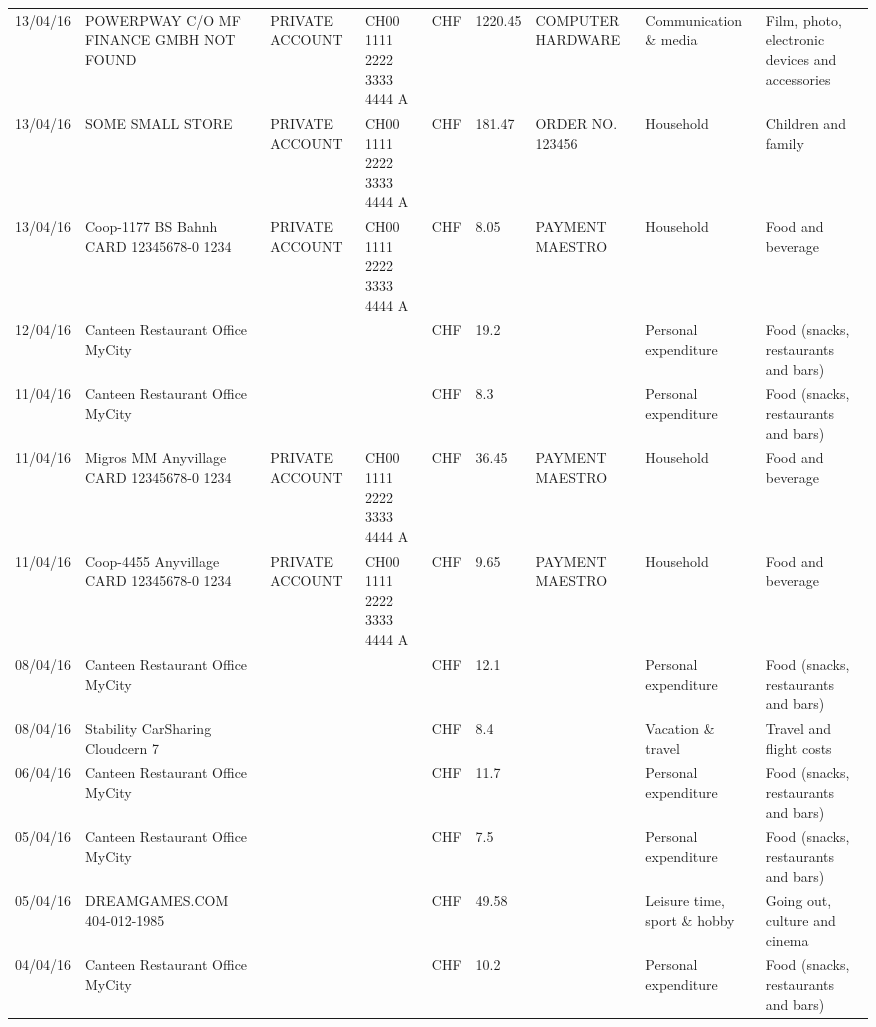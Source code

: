 \begin{landscape}
\begin{center}
\begin{longtable}{lllllllll}
		13/04/16 & POWERPWAY C/O MF FINANCE GMBH NOT FOUND & PRIVATE ACCOUNT & CH00 1111 2222 3333 4444 A & CHF   & 1220.45 & COMPUTER HARDWARE & Communication \& media & Film, photo, electronic devices and accessories \\
		13/04/16 & SOME SMALL STORE & PRIVATE ACCOUNT & CH00 1111 2222 3333 4444 A & CHF   & 181.47 & ORDER NO. 123456 & Household & Children and family \\
		13/04/16 & Coop-1177 BS Bahnh CARD 12345678-0 1234 & PRIVATE ACCOUNT & CH00 1111 2222 3333 4444 A & CHF   & 8.05  & PAYMENT MAESTRO & Household & Food and beverage \\
		12/04/16 & Canteen Restaurant Office      MyCity &       &       & CHF   & 19.2  &       & Personal expenditure & Food (snacks, restaurants and bars) \\
		11/04/16 & Canteen Restaurant Office      MyCity &       &       & CHF   & 8.3   &       & Personal expenditure & Food (snacks, restaurants and bars) \\
		11/04/16 & Migros MM Anyvillage CARD 12345678-0 1234 & PRIVATE ACCOUNT & CH00 1111 2222 3333 4444 A & CHF   & 36.45 & PAYMENT MAESTRO & Household & Food and beverage \\
		11/04/16 & Coop-4455 Anyvillage CARD 12345678-0 1234 & PRIVATE ACCOUNT & CH00 1111 2222 3333 4444 A & CHF   & 9.65  & PAYMENT MAESTRO & Household & Food and beverage \\
		08/04/16 & Canteen Restaurant Office      MyCity &       &       & CHF   & 12.1  &       & Personal expenditure & Food (snacks, restaurants and bars) \\
		08/04/16 & Stability CarSharing      Cloudcern 7 &       &       & CHF   & 8.4   &       & Vacation \& travel & Travel and flight costs \\
		06/04/16 & Canteen Restaurant Office      MyCity &       &       & CHF   & 11.7  &       & Personal expenditure & Food (snacks, restaurants and bars) \\
		05/04/16 & Canteen Restaurant Office      MyCity &       &       & CHF   & 7.5   &       & Personal expenditure & Food (snacks, restaurants and bars) \\
		05/04/16 & DREAMGAMES.COM           404-012-1985 &       &       & CHF   & 49.58 &       & Leisure time, sport \& hobby & Going out, culture and cinema \\
		04/04/16 & Canteen Restaurant Office      MyCity &       &       & CHF   & 10.2  &       & Personal expenditure & Food (snacks, restaurants and bars) \\

\end{longtable}
\end{center}
\end{landscape}
